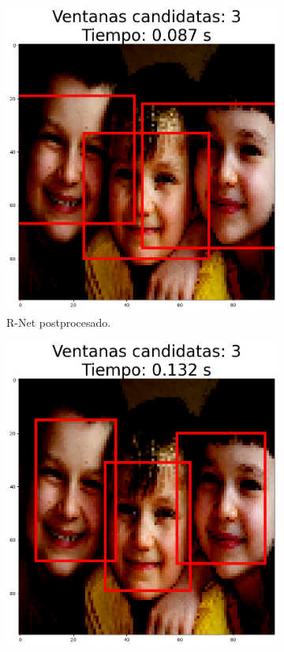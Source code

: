 \begin{figure}[!htpb]
\begin{subfigure}[b]{0.28\textwidth}
         \includegraphics[width=\textwidth]{./Figures/test_tf_rnet_a.png}
         \caption{R-Net postprocesado.}
         \label{fig:2de3}
     \end{subfigure}
     \hfill
	 \begin{subfigure}[b]{0.28\textwidth}
         \centering
         \includegraphics[width=\textwidth]{./Figures/test_tf_onet_a.png}

\end{subfigure}
\end{figure}
